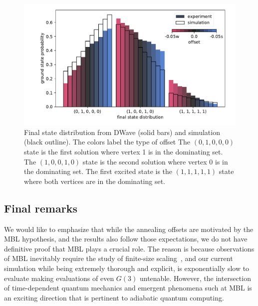 \documentclass[prd,twocolumn,tightenlines,preprintnumbers,showpacs,superscriptaddress,notitlepage,nofootinbib,eqsecnum,floatfix,longbibliography,aps,10pt]{revtex4-2}
\begin{document}
\begin{figure}
	\centering
	\includegraphics[width=\columnwidth]{./new_figures/final_state_distribution.pdf}
	\caption{Final state distribution from DWave (solid bars) and simulation (black outline). The colors label the type of offset  The $(0, 1, 0, 0, 0)$ state is the first solution where vertex 1 is in the dominating set. The $(1, 0, 0, 1, 0)$ state is the second solution where vertex 0 is in the dominating set. The first excited state is the $(1, 1, 1, 1, 1)$ state where both vertices are in the dominating set.}
	\label{fig:final_state_distribution}
\end{figure}


\subsection{Final remarks}
\label{sec:results:final}
We would like to emphasize that while the annealing offsets are motivated by the MBL hypothesis, and the results also follow those expectations, we do not have definitive proof that MBL plays a crucial role.
The reason is because observations of MBL inevitably require the study of finite-size scaling~\cite{2015PhRvB..91h1103L}, and our current simulation while being extremely thorough and explicit, is exponentially slow to evaluate making evaluations of even $G(3)$ untenable.
However, the intersection of time-dependent quantum mechanics and emergent phenomena such at MBL is an exciting direction that is pertinent to adiabatic quantum computing.






\end{document}
